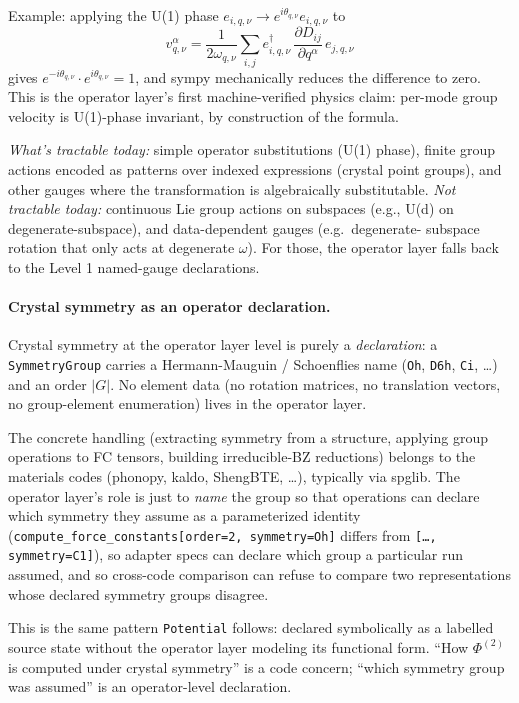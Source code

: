 \documentclass[11pt,a4paper]{article}
\begin{document}
Example: applying the U(1) phase $e_{i,q,\nu} \to e^{i\theta_{q,\nu}}
e_{i,q,\nu}$ to
\begin{equation*}
  v^\alpha_{q,\nu} = \frac{1}{2\omega_{q,\nu}} \sum_{i,j} e^\dagger_{i,q,\nu}\,
    \frac{\partial D_{ij}}{\partial q^\alpha}\, e_{j,q,\nu}
\end{equation*}
gives $e^{-i\theta_{q,\nu}} \cdot e^{i\theta_{q,\nu}} = 1$, and sympy
mechanically reduces the difference to zero. This is the operator layer's
first machine-verified physics claim: per-mode group velocity is
U(1)-phase invariant, by construction of the formula.

\emph{What's tractable today:} simple operator substitutions (U(1)
phase), finite group actions encoded as patterns over indexed
expressions (crystal point groups), and other gauges where the
transformation is algebraically substitutable. \emph{Not tractable
today:} continuous Lie group actions on subspaces (e.g., U(d) on
degenerate-subspace), and data-dependent gauges (e.g.\ degenerate-
subspace rotation that only acts at degenerate $\omega$). For those,
the operator layer falls back to the Level 1 named-gauge declarations.

\paragraph{Crystal symmetry as an operator declaration.} Crystal symmetry
at the operator layer level is purely a \emph{declaration}: a
\texttt{SymmetryGroup} carries a Hermann-Mauguin / Schoenflies name
(\texttt{Oh}, \texttt{D6h}, \texttt{Ci}, \ldots) and an order $|G|$.
No element data (no rotation matrices, no translation vectors, no
group-element enumeration) lives in the operator layer.

The concrete handling (extracting symmetry from a structure,
applying group operations to FC tensors, building irreducible-BZ
reductions) belongs to the materials codes (phonopy, kaldo,
ShengBTE, \ldots), typically via spglib. The operator layer's role is just to
\emph{name} the group so that operations can declare which symmetry they
assume as a parameterized identity
(\texttt{compute\_force\_constants[order=2, symmetry=Oh]} differs from
\texttt{[\ldots, symmetry=C1]}), so adapter specs can declare which
group a particular run assumed, and so cross-code comparison can refuse
to compare two representations whose declared symmetry groups disagree.

This is the same pattern \texttt{Potential} follows: declared symbolically
as a labelled source state without the operator layer modeling its functional
form. ``How $\Phi^{(2)}$ is computed under crystal symmetry'' is a code
concern; ``which symmetry group was assumed'' is an operator-level
declaration.
\end{document}
